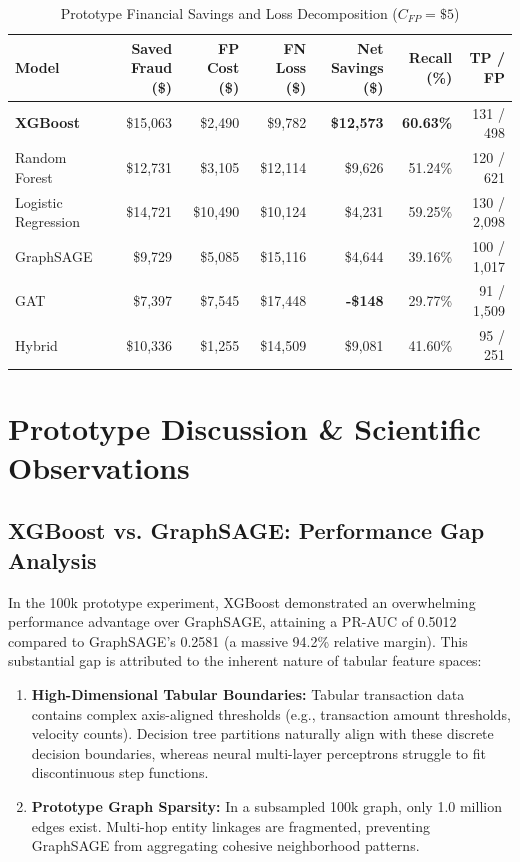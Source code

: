 \documentclass[11pt,a4paper]{report}
\begin{document}
\begin{table}[H]
\centering
\caption{Prototype Financial Savings and Loss Decomposition ($C_{FP} = \$5$)}
\label{tab:proto_financial}
\begin{tabular}{lrrrrrr}
\toprule
\textbf{Model} & \textbf{Saved Fraud (\$)} & \textbf{FP Cost (\$)} & \textbf{FN Loss (\$)} & \textbf{Net Savings (\$)} & \textbf{Recall (\%)} & \textbf{TP / FP} \\
\midrule
\textbf{XGBoost} & \$15,063 & \$2,490 & \$9,782 & \textbf{\$12,573} & \textbf{60.63\%} & 131 / 498 \\
Random Forest & \$12,731 & \$3,105 & \$12,114 & \$9,626 & 51.24\% & 120 / 621 \\
Logistic Regression & \$14,721 & \$10,490 & \$10,124 & \$4,231 & 59.25\% & 130 / 2,098 \\
GraphSAGE & \$9,729 & \$5,085 & \$15,116 & \$4,644 & 39.16\% & 100 / 1,017 \\
GAT & \$7,397 & \$7,545 & \$17,448 & \textbf{-\$148} & 29.77\% & 91 / 1,509 \\
Hybrid & \$10,336 & \$1,255 & \$14,509 & \$9,081 & 41.60\% & 95 / 251 \\
\bottomrule
\end{tabular}
\end{table}

\newpage
\section{Prototype Discussion \& Scientific Observations}

\subsection{XGBoost vs. GraphSAGE: Performance Gap Analysis}
In the 100k prototype experiment, XGBoost demonstrated an overwhelming performance advantage over GraphSAGE, attaining a PR-AUC of 0.5012 compared to GraphSAGE's 0.2581 (a massive 94.2\% relative margin). This substantial gap is attributed to the inherent nature of tabular feature spaces:
\begin{enumerate}
    \item \textbf{High-Dimensional Tabular Boundaries:} Tabular transaction data contains complex axis-aligned thresholds (e.g., transaction amount thresholds, velocity counts). Decision tree partitions naturally align with these discrete decision boundaries, whereas neural multi-layer perceptrons struggle to fit discontinuous step functions.
    \item \textbf{Prototype Graph Sparsity:} In a subsampled 100k graph, only 1.0 million edges exist. Multi-hop entity linkages are fragmented, preventing GraphSAGE from aggregating cohesive neighborhood patterns.
\end{enumerate}
\end{document}
